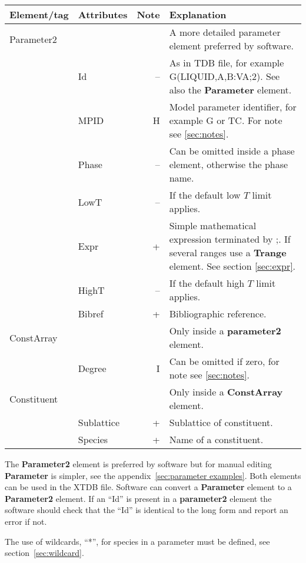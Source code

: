 \documentclass{article}
\begin{document}
\bigskip
\begin{tabular}{|p{} p{} r p{}|}\hline
  Element/tag & Attributes & Note & Explanation\\\hline

  Parameter2 & && A more detailed parameter element preferred by software.\\
      & Id & -- & As in TDB file, for example G(LIQUID,A,B:VA;2).  See also the {\bf Parameter} element. \\
      & MPID & H & Model parameter identifier, for example G or TC.  For note see \ref{sec:notes}.\\
      & Phase & -- & Can be omitted inside a phase element, otherwise the phase name.\\
      & LowT & -- & If the default low $T$ limit applies.\\
      & Expr & + & Simple mathematical expression terminated by ;.  If several ranges use a {\bf Trange} element.  See section \ref{sec:expr}.\\
      & HighT & -- & If the default high $T$ limit applies.\\
      & Bibref & + & Bibliographic reference.\\\hline

  ConstArray & && Only inside a {\bf parameter2} element.\\
      & Degree & I & Can be omitted if zero, for note see \ref{sec:notes}.\\\hline
  
  Constituent & && Only inside a {\bf ConstArray} element.\\
      & Sublattice & + &  Sublattice of constituent.\\
      & Species & + & Name of a constituent.\\\hline
\end{tabular}

\bigskip
The {\bf Parameter2} element is preferred by software but for manual
editing {\bf Parameter} is simpler, see the
appendix~\ref{sec:parameter examples}.  Both elements can be used in
the XTDB file.  Software can convert a {\bf Parameter} element to a
{\bf Parameter2} element.  If an ``Id'' is present in a {\bf
  parameter2} element the software should check that the ``Id'' is
identical to the long form and report an error if not.

The use of wildcards, ``*'', for species in a parameter must be
defined, see section~\ref{sec:wildcard}.
\end{document}
